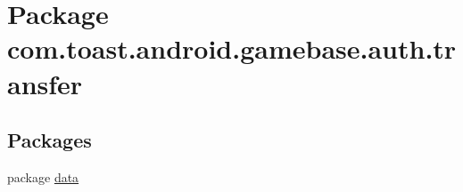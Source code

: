 \hypertarget{namespacecom_1_1toast_1_1android_1_1gamebase_1_1auth_1_1transfer}{}\section{Package com.\+toast.\+android.\+gamebase.\+auth.\+transfer}
\label{namespacecom_1_1toast_1_1android_1_1gamebase_1_1auth_1_1transfer}
\subsection*{Packages}
\begin{DoxyCompactItemize}
\item 
package \hyperlink{namespacecom_1_1toast_1_1android_1_1gamebase_1_1auth_1_1transfer_1_1data}{data}
\end{DoxyCompactItemize}
